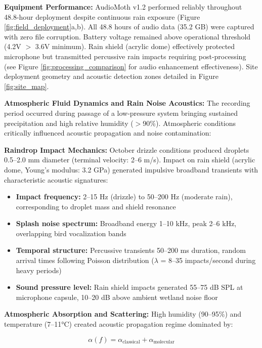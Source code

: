 \documentclass[twocolumn]{article}
\begin{document}
\textbf{Equipment Performance:} AudioMoth v1.2 performed reliably throughout 48.8-hour deployment despite continuous rain exposure (Figure \ref{fig:field_deployment}a,b). All 48.8 hours of audio data (35.2 GB) were captured with zero file corruption. Battery voltage remained above operational threshold (4.2V $>$ 3.6V minimum). Rain shield (acrylic dome) effectively protected microphone but transmitted percussive rain impacts requiring post-processing (see Figure \ref{fig:processing_comparison} for audio enhancement effectiveness). Site deployment geometry and acoustic detection zones detailed in Figure \ref{fig:site_map}.

\textbf{Atmospheric Fluid Dynamics and Rain Noise Acoustics:} The recording period occurred during passage of a low-pressure system bringing sustained precipitation and high relative humidity ($>$90\%). Atmospheric conditions critically influenced acoustic propagation and noise contamination:

\textbf{Raindrop Impact Mechanics:} October drizzle conditions produced droplets 0.5--2.0 mm diameter (terminal velocity: 2--6 m/s). Impact on rain shield (acrylic dome, Young's modulus: 3.2 GPa) generated impulsive broadband transients with characteristic acoustic signatures:

\begin{itemize}
\item \textbf{Impact frequency:} 2--15 Hz (drizzle) to 50--200 Hz (moderate rain), corresponding to droplet mass and shield resonance
\item \textbf{Splash noise spectrum:} Broadband energy 1--10 kHz, peak 2--6 kHz, overlapping bird vocalization bands
\item \textbf{Temporal structure:} Percussive transients 50--200 ms duration, random arrival times following Poisson distribution ($\lambda$ = 8--35 impacts/second during heavy periods)
\item \textbf{Sound pressure level:} Rain shield impacts generated 55--75 dB SPL at microphone capsule, 10--20 dB above ambient wetland noise floor
\end{itemize}

\textbf{Atmospheric Absorption and Scattering:} High humidity (90--95\%) and temperature (7--11°C) created acoustic propagation regime dominated by:

\begin{equation}
\alpha(f) = \alpha_{\text{classical}} + \alpha_{\text{molecular}}
\label{eq:atmospheric_absorption}
\end{equation}
\end{document}
